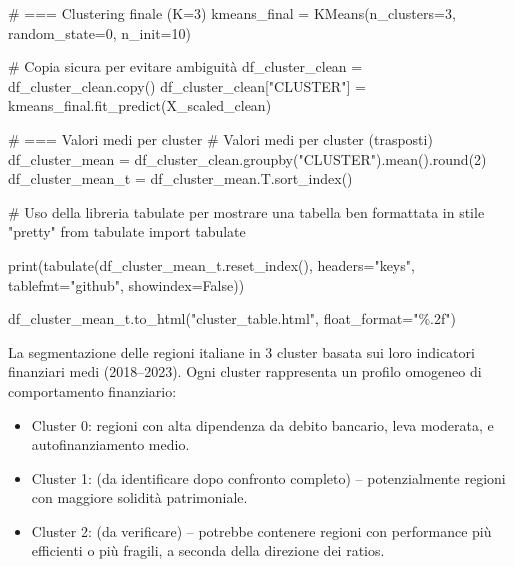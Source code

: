 \documentclass[
  letterpaper,
  DIV=11,
  numbers=noendperiod]{scrartcl}
\newenvironment{Shaded}{\begin{snugshade}}{\end{snugshade}}
\newcommand{\BuiltInTok}[1]{\textcolor[rgb]{0.00,0.23,0.31}{#1}}
\newcommand{\CommentTok}[1]{\textcolor[rgb]{0.37,0.37,0.37}{#1}}
\newcommand{\DecValTok}[1]{\textcolor[rgb]{0.68,0.00,0.00}{#1}}
\newcommand{\ImportTok}[1]{\textcolor[rgb]{0.00,0.46,0.62}{#1}}
\newcommand{\NormalTok}[1]{\textcolor[rgb]{0.00,0.23,0.31}{#1}}
\newcommand{\OperatorTok}[1]{\textcolor[rgb]{0.37,0.37,0.37}{#1}}
\newcommand{\SpecialCharTok}[1]{\textcolor[rgb]{0.37,0.37,0.37}{#1}}
\newcommand{\StringTok}[1]{\textcolor[rgb]{0.13,0.47,0.30}{#1}}
\newcommand{\VariableTok}[1]{\textcolor[rgb]{0.07,0.07,0.07}{#1}}
\providecommand{\tightlist}{%
  \setlength{\itemsep}{0pt}\setlength{\parskip}{0pt}}
\begin{document}
\begin{Shaded}
\begin{Highlighting}[]
\CommentTok{\# === Clustering finale (K=3)}
\NormalTok{kmeans\_final }\OperatorTok{=}\NormalTok{ KMeans(n\_clusters}\OperatorTok{=}\DecValTok{3}\NormalTok{, random\_state}\OperatorTok{=}\DecValTok{0}\NormalTok{, n\_init}\OperatorTok{=}\DecValTok{10}\NormalTok{)}

\CommentTok{\# Copia sicura per evitare ambiguità}
\NormalTok{df\_cluster\_clean }\OperatorTok{=}\NormalTok{ df\_cluster\_clean.copy()}
\NormalTok{df\_cluster\_clean[}\StringTok{"CLUSTER"}\NormalTok{] }\OperatorTok{=}\NormalTok{ kmeans\_final.fit\_predict(X\_scaled\_clean)}

\CommentTok{\# === Valori medi per cluster}
\CommentTok{\# Valori medi per cluster (trasposti)}
\NormalTok{df\_cluster\_mean }\OperatorTok{=}\NormalTok{ df\_cluster\_clean.groupby(}\StringTok{"CLUSTER"}\NormalTok{).mean().}\BuiltInTok{round}\NormalTok{(}\DecValTok{2}\NormalTok{)}
\NormalTok{df\_cluster\_mean\_t }\OperatorTok{=}\NormalTok{ df\_cluster\_mean.T.sort\_index()}

\CommentTok{\# Uso della libreria tabulate per mostrare una tabella ben formattata in stile "pretty"}
\ImportTok{from}\NormalTok{ tabulate }\ImportTok{import}\NormalTok{ tabulate}

\BuiltInTok{print}\NormalTok{(tabulate(df\_cluster\_mean\_t.reset\_index(), headers}\OperatorTok{=}\StringTok{"keys"}\NormalTok{, tablefmt}\OperatorTok{=}\StringTok{"github"}\NormalTok{, showindex}\OperatorTok{=}\VariableTok{False}\NormalTok{))}

\NormalTok{df\_cluster\_mean\_t.to\_html(}\StringTok{"cluster\_table.html"}\NormalTok{, float\_format}\OperatorTok{=}\StringTok{"}\SpecialCharTok{\%.2f}\StringTok{"}\NormalTok{)}
\end{Highlighting}
\end{Shaded}

La segmentazione delle regioni italiane in 3 cluster basata sui loro
indicatori finanziari medi (2018--2023). Ogni cluster rappresenta un
profilo omogeneo di comportamento finanziario:

\begin{itemize}
\tightlist
\item
  Cluster 0: regioni con alta dipendenza da debito bancario, leva
  moderata, e autofinanziamento medio.
\item
  Cluster 1: (da identificare dopo confronto completo) -- potenzialmente
  regioni con maggiore solidità patrimoniale.
\item
  Cluster 2: (da verificare) -- potrebbe contenere regioni con
  performance più efficienti o più fragili, a seconda della direzione
  dei ratios.
\end{itemize}
\end{document}

